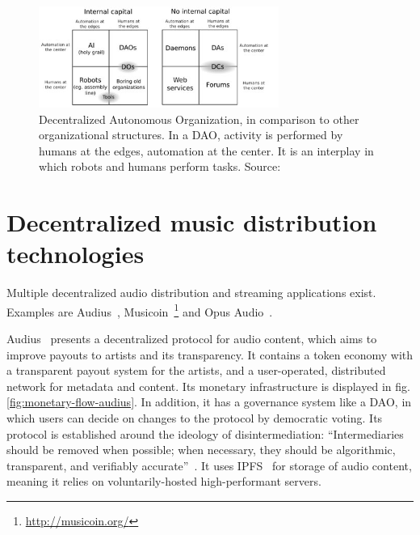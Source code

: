
\begin{figure}
    \centering
    \includegraphics[width=0.7\textwidth]{introduction/dao-quadrants.jpg}
    \caption{Decentralized Autonomous Organization, in comparison to other organizational structures. In a DAO, activity is performed by humans at the edges, automation at the center. It is an interplay in which robots and humans perform tasks. Source: \cite{buterin2014dao}}
    \label{fig:dao-quadrants}
\end{figure}

\section{Decentralized music distribution technologies}
\label{sec:related-work}
Multiple decentralized audio distribution and streaming applications exist. Examples are Audius~\citep{audius2018}, Musicoin~\footnote{\url{http://musicoin.org/}} and Opus Audio~\citep{jia2016opus}.

Audius~\citep{audius2018} presents a decentralized protocol for audio content, which aims to improve payouts to artists and its transparency. It contains a token economy with a transparent payout system for the artists, and a user-operated, distributed network for metadata and content. Its monetary infrastructure is displayed in fig. \ref{fig:monetary-flow-audius}. In addition, it has a governance system like a DAO, in which users can decide on changes to the protocol by democratic voting. Its protocol is established around the ideology of disintermediation: ``Intermediaries  should be removed  when possible; when necessary, they should be algorithmic, transparent, and verifiably accurate''~\citep{audius2018}. It uses IPFS~\citep{benet2014ipfs} for storage of audio content, meaning it relies on voluntarily-hosted high-performant servers.

